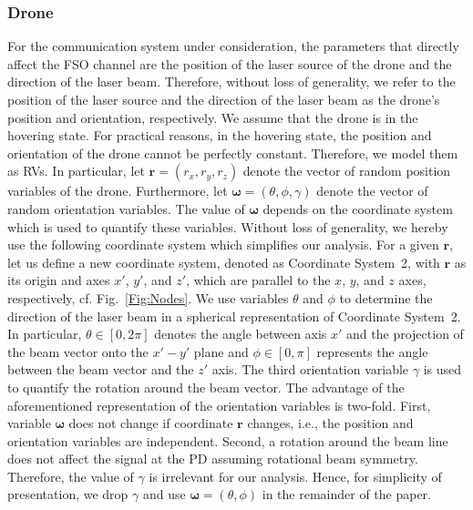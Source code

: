 \documentclass[conference]{IEEEtran}
\begin{document}
\subsubsection{Drone} For the communication system under consideration, the parameters that directly affect the FSO channel are the position of the laser source of the drone and the direction of the laser beam. Therefore, without loss of generality, we refer to the position of the laser source  and the direction of the laser beam as the drone's position and orientation, respectively.   We assume that the drone is in the hovering state. For practical reasons, in the hovering state, the position and orientation of the drone cannot be perfectly constant. Therefore, we model them as RVs.  In particular, let $\mathbf{r}=(r_x,r_y,r_z)$ denote the vector of random position variables of the drone. 
Furthermore, let  $\boldsymbol{\omega} = (\theta,\phi,\gamma)$ denote the vector of random orientation variables. The value of $\boldsymbol{\omega}$ depends on the coordinate system which is used to quantify these variables. Without loss of generality, we hereby use the following coordinate system which simplifies our analysis. For a given  $\mathbf{r}$, let us define a new coordinate system, denoted as Coordinate System~2, with $\mathbf{r}$ as its origin and axes  $x'$, $y'$, and $z'$, which are parallel to the $x$, $y$, and $z$ axes, respectively, cf. Fig.~\ref{Fig:Nodes}. We use variables $\theta$ and $\phi$ to determine the direction of the laser beam in a spherical representation of Coordinate System~2. In particular, $\theta\in[0,2\pi]$ denotes the angle between axis $x'$ and the projection of the beam vector onto the $x'-y'$ plane and $\phi\in[0,\pi]$ represents the angle between the beam vector and the $z'$ axis. The third orientation variable $\gamma$ is used to quantify the rotation around the beam vector. The advantage of the aforementioned representation of the orientation variables is two-fold. First, variable  $\boldsymbol{\omega}$ does not change if coordinate $\mathbf{r}$ changes, i.e., the position and orientation variables are independent. Second, a rotation around the beam line does not affect the signal at the PD assuming rotational beam symmetry. Therefore, the value of $\gamma$ is irrelevant for our analysis.  Hence, for simplicity of presentation, we drop  $\gamma$ and use  $\boldsymbol{\omega} = (\theta,\phi)$  in the remainder of the paper. 
\end{document}
